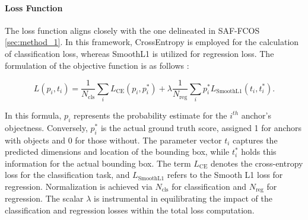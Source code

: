 \documentclass[report.tex]{subfiles}
\begin{document}
    \paragraph*{Loss Function}




    The loss function aligns closely with the one delineated in SAF-FCOS \ref{sec:method_1}. In this framework, CrossEntropy is employed for the calculation of classification loss, whereas SmoothL1 is utilized for regression loss. The formulation of the objective function is as follows \cite{cai2018cascade}:

    \begin{equation}
        L(p_i, t_i) = \frac{1}{N_{\text{cls}}} \sum_i L_{\text{CE}}(p_i, p_i^*) + \lambda \frac{1}{N_{\text{reg}}} \sum_i p_i^* L_{\text{SmoothL1}}(t_i, t_i^*).
        \end{equation}

    In this formula, \( p_i \) represents the probability estimate for the \( i^{th} \) anchor's objectness. Conversely, \( p_i^* \) is the actual ground truth score, assigned 1 for anchors with objects and 0 for those without. The parameter vector \( t_i \) captures the predicted dimensions and location of the bounding box, while \( t_i^* \) holds this information for the actual bounding box. The term \( L_{\text{CE}} \) denotes the cross-entropy loss for the classification task, and \( L_{\text{SmoothL1}} \) refers to the Smooth L1 loss for regression. Normalization is achieved via \( N_{\text{cls}} \) for classification and \( N_{\text{reg}} \) for regression. The scalar \( \lambda \) is instrumental in equilibrating the impact of the classification and regression losses within the total loss computation.
\end{document}
